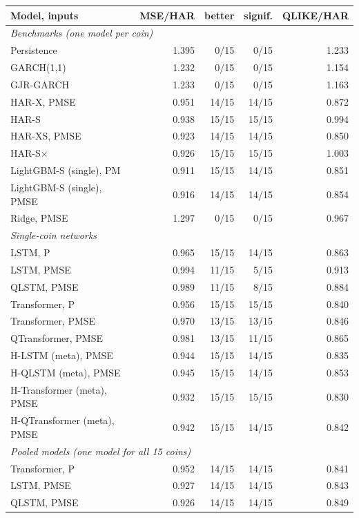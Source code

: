 \begin{tabular}{lrrrr}
\toprule
Model, inputs & MSE/HAR & better & signif. & QLIKE/HAR \\
\midrule
\multicolumn{5}{l}{\emph{Benchmarks (one model per coin)}} \\
Persistence & 1.395 & 0/15 & 0/15 & 1.233 \\
GARCH(1,1) & 1.232 & 0/15 & 0/15 & 1.154 \\
GJR-GARCH & 1.233 & 0/15 & 0/15 & 1.163 \\
HAR-X, PMSE & 0.951 & 14/15 & 14/15 & 0.872 \\
HAR-S & 0.938 & 15/15 & 15/15 & 0.994 \\
HAR-XS, PMSE & 0.923 & 14/15 & 14/15 & 0.850 \\
HAR-S$\times$ & 0.926 & 15/15 & 15/15 & 1.003 \\
LightGBM-S (single), PM & 0.911 & 15/15 & 14/15 & 0.851 \\
LightGBM-S (single), PMSE & 0.916 & 14/15 & 14/15 & 0.854 \\
Ridge, PMSE & 1.297 & 0/15 & 0/15 & 0.967 \\
\midrule
\multicolumn{5}{l}{\emph{Single-coin networks}} \\
LSTM, P & 0.965 & 15/15 & 14/15 & 0.863 \\
LSTM, PMSE & 0.994 & 11/15 & 5/15 & 0.913 \\
QLSTM, PMSE & 0.989 & 11/15 & 8/15 & 0.884 \\
Transformer, P & 0.956 & 15/15 & 15/15 & 0.840 \\
Transformer, PMSE & 0.970 & 13/15 & 13/15 & 0.846 \\
QTransformer, PMSE & 0.981 & 13/15 & 11/15 & 0.865 \\
H-LSTM (meta), PMSE & 0.944 & 15/15 & 14/15 & 0.835 \\
H-QLSTM (meta), PMSE & 0.945 & 15/15 & 14/15 & 0.853 \\
H-Transformer (meta), PMSE & 0.932 & 15/15 & 15/15 & 0.830 \\
H-QTransformer (meta), PMSE & 0.942 & 15/15 & 14/15 & 0.842 \\
\midrule
\multicolumn{5}{l}{\emph{Pooled models (one model for all 15 coins)}} \\
Transformer, P & 0.952 & 14/15 & 14/15 & 0.841 \\
LSTM, PMSE & 0.927 & 14/15 & 14/15 & 0.843 \\
QLSTM, PMSE & 0.926 & 14/15 & 14/15 & 0.849 \\

\end{tabular}
